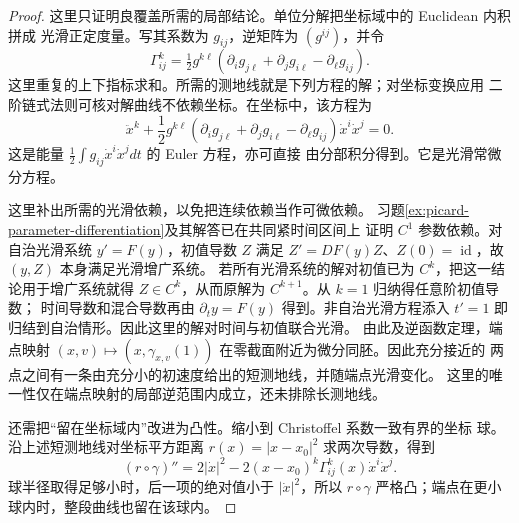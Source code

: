 \begin{proof}
这里只证明良覆盖所需的局部结论。单位分解把坐标域中的 Euclidean 内积拼成
光滑正定度量。写其系数为 $g_{ij}$，逆矩阵为 $(g^{ij})$，并令
\[
 \Gamma^k_{ij}=\tfrac12g^{k\ell}
 (\partial_i g_{j\ell}+\partial_jg_{i\ell}-\partial_\ell g_{ij}).
\]
这里重复的上下指标求和。所需的测地线就是下列方程的解；对坐标变换应用
二阶链式法则可核对解曲线不依赖坐标。在坐标中，该方程为
\[
 \ddot x^k+\frac12g^{k\ell}
 (\partial_i g_{j\ell}+\partial_jg_{i\ell}-\partial_\ell g_{ij})
 \dot x^i\dot x^j=0.
\]
这是能量 $\tfrac12\int g_{ij}\dot x^i\dot x^jdt$ 的 Euler 方程，亦可直接
由分部积分得到。它是光滑常微分方程。

这里补出所需的光滑依赖，以免把连续依赖当作可微依赖。
习题\ref{ex:picard-parameter-differentiation}及其解答已在共同紧时间区间上
证明 $C^1$ 参数依赖。对自治光滑系统 $y'=F(y)$，初值导数 $Z$ 满足
$Z'=DF(y)Z$、$Z(0)=\operatorname{id}$，故 $(y,Z)$ 本身满足光滑增广系统。
若所有光滑系统的解对初值已为 $C^k$，把这一结论用于增广系统就得
$Z\in C^k$，从而原解为 $C^{k+1}$。从 $k=1$ 归纳得任意阶初值导数；
时间导数和混合导数再由 $\partial_ty=F(y)$ 得到。非自治光滑方程添入
$t'=1$ 即归结到自治情形。因此这里的解对时间与初值联合光滑。
由此及逆函数定理，端点映射
$(x,v)\mapsto(x,\gamma_{x,v}(1))$ 在零截面附近为微分同胚。因此充分接近的
两点之间有一条由充分小的初速度给出的短测地线，并随端点光滑变化。
这里的唯一性仅在端点映射的局部逆范围内成立，还未排除长测地线。

还需把“留在坐标域内”改进为凸性。缩小到 Christoffel 系数一致有界的坐标
球。沿上述短测地线对坐标平方距离 $r(x)=|x-x_0|^2$ 求两次导数，得到
\[
 (r\circ\gamma)''
 =2|\dot x|^2-2(x-x_0)^k\Gamma^k_{ij}(x)\dot x^i\dot x^j.
\]
球半径取得足够小时，后一项的绝对值小于 $|\dot x|^2$，所以
$r\circ\gamma$ 严格凸；端点在更小球内时，整段曲线也留在该球内。


\end{proof}

